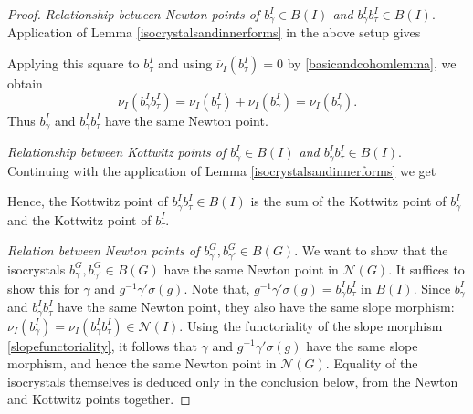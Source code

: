 \documentclass[11pt,a4paper]{article}
\theoremstyle{definition}
\theoremstyle{plain}
\theoremstyle{remark}
\theoremstyle{plain}
\begin{document}
\begin{proof}
    \textit{Relationship between Newton points of $b_{\gamma}^I \in B(I)$ and $b_{\gamma}^I b_{\tau}^I \in B(I)$}. Application of Lemma \ref{isocrystalsandinnerforms} in the above setup gives
    \begin{center}
    \end{center}
    Applying this square to $b_{\tau}^I$ and using $\overline{\nu}_I(b_{\tau}^I)=0$ by \ref{basicandcohomlemma}, we obtain
    $$\overline{\nu}_I(b_{\gamma}^I b_{\tau}^I)=\overline{\nu}_I(b_{\tau}^I)+\overline{\nu}_I(b_{\gamma}^I)=\overline{\nu}_I(b_{\gamma}^I).$$
    Thus $b_{\gamma}^I$ and $b_{\gamma}^I b_{\tau}^I$ have the same Newton point.

    \textit{Relationship between Kottwitz points of $b_{\gamma}^I \in B(I)$ and $b_{\gamma}^I b_{\tau}^I \in B(I)$}. Continuing with the application of Lemma \ref{isocrystalsandinnerforms} we get
    \begin{center}
    \end{center}
    Hence, the Kottwitz point of $b_{\gamma}^I b_{\tau}^I \in B(I)$ is the sum of the Kottwitz point of $b_{\gamma}^I$ and the Kottwitz point of $b_{\tau}^I$.

    \textit{Relation between Newton points of $b_{\gamma}^G, b_{\gamma'}^G \in B(G)$}. We want to show that the isocrystals $b_{\gamma}^G, b_{\gamma'}^G \in B(G)$ have the same Newton point in $\mathcal{N}(G)$. It suffices to show this for $\gamma$ and $g^{-1}\gamma'\sigma(g)$. Note that, $g^{-1} \gamma' \sigma(g) = b_{\gamma}^I b_{\tau}^I$ in $B(I)$. Since $b_{\gamma}^I$ and $b_{\gamma}^I b_{\tau}^I$ have the same Newton point, they also have the same slope morphism: $\nu_I(b_{\gamma}^I) = \nu_I(b_{\gamma}^I b_{\tau}^I) \in \mathcal{N}(I)$. Using the functoriality of the slope morphism \ref{slopefunctoriality}, it follows that $\gamma$ and $g^{-1}\gamma'\sigma(g)$ have the same slope morphism, and hence the same Newton point in $\mathcal{N}(G)$. Equality of the isocrystals themselves is deduced only in the conclusion below, from the Newton and Kottwitz points together.


\end{proof}
\end{document}
